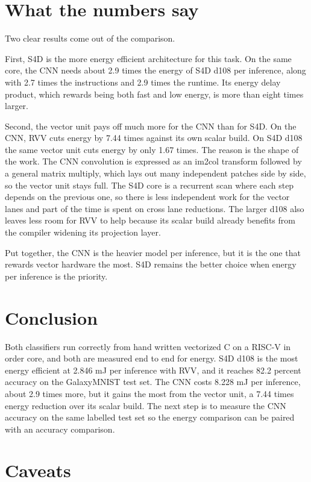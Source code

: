 \documentclass[11pt]{article}
\begin{document}
\section{What the numbers say}

Two clear results come out of the comparison.

First, S4D is the more energy efficient architecture for this task. On the same core, the CNN needs about 2.9 times the energy of S4D d108 per inference, along with 2.7 times the instructions and 2.9 times the runtime. Its energy delay product, which rewards being both fast and low energy, is more than eight times larger.

Second, the vector unit pays off much more for the CNN than for S4D. On the CNN, RVV cuts energy by 7.44 times against its own scalar build. On S4D d108 the same vector unit cuts energy by only 1.67 times. The reason is the shape of the work. The CNN convolution is expressed as an im2col transform followed by a general matrix multiply, which lays out many independent patches side by side, so the vector unit stays full. The S4D core is a recurrent scan where each step depends on the previous one, so there is less independent work for the vector lanes and part of the time is spent on cross lane reductions. The larger d108 also leaves less room for RVV to help because its scalar build already benefits from the compiler widening its projection layer.

Put together, the CNN is the heavier model per inference, but it is the one that rewards vector hardware the most. S4D remains the better choice when energy per inference is the priority.

\section{Conclusion}

Both classifiers run correctly from hand written vectorized C on a RISC-V in order core, and both are measured end to end for energy. S4D d108 is the most energy efficient at 2.846 mJ per inference with RVV, and it reaches 82.2 percent accuracy on the GalaxyMNIST test set. The CNN costs 8.228 mJ per inference, about 2.9 times more, but it gains the most from the vector unit, a 7.44 times energy reduction over its scalar build. The next step is to measure the CNN accuracy on the same labelled test set so the energy comparison can be paired with an accuracy comparison.

\section*{Caveats}
\end{document}
